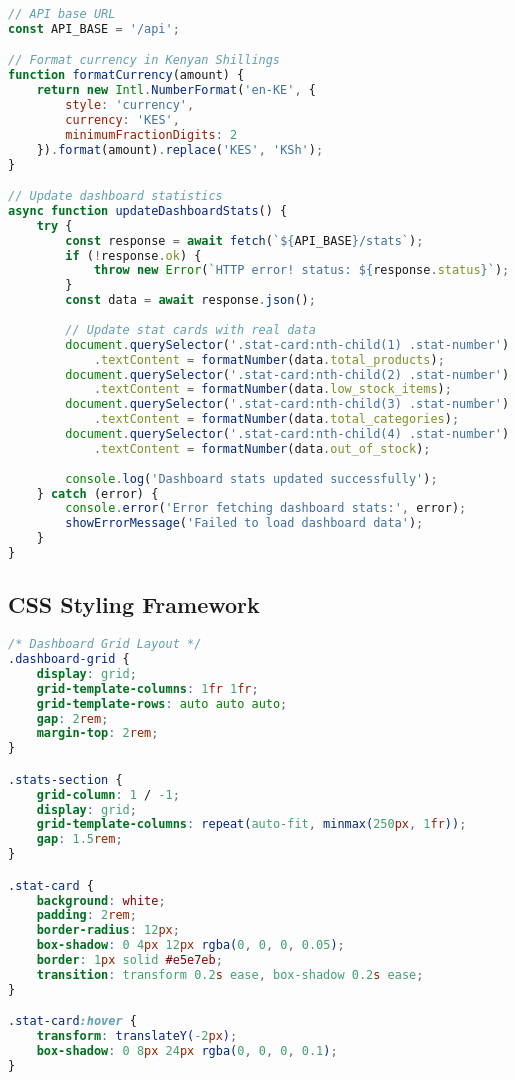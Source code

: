 \documentclass[12pt,a4paper]{article}
\begin{document}
\begin{lstlisting}[language=JavaScript, caption=Dashboard API Integration]
// API base URL
const API_BASE = '/api';

// Format currency in Kenyan Shillings
function formatCurrency(amount) {
    return new Intl.NumberFormat('en-KE', {
        style: 'currency',
        currency: 'KES',
        minimumFractionDigits: 2
    }).format(amount).replace('KES', 'KSh');
}

// Update dashboard statistics
async function updateDashboardStats() {
    try {
        const response = await fetch(`${API_BASE}/stats`);
        if (!response.ok) {
            throw new Error(`HTTP error! status: ${response.status}`);
        }
        const data = await response.json();
        
        // Update stat cards with real data
        document.querySelector('.stat-card:nth-child(1) .stat-number')
            .textContent = formatNumber(data.total_products);
        document.querySelector('.stat-card:nth-child(2) .stat-number')
            .textContent = formatNumber(data.low_stock_items);
        document.querySelector('.stat-card:nth-child(3) .stat-number')
            .textContent = formatNumber(data.total_categories);
        document.querySelector('.stat-card:nth-child(4) .stat-number')
            .textContent = formatNumber(data.out_of_stock);
        
        console.log('Dashboard stats updated successfully');
    } catch (error) {
        console.error('Error fetching dashboard stats:', error);
        showErrorMessage('Failed to load dashboard data');
    }
}
\end{lstlisting}

\subsection{CSS Styling Framework}

\begin{lstlisting}[language=CSS, caption=Modern CSS Grid Layout]
/* Dashboard Grid Layout */
.dashboard-grid {
    display: grid;
    grid-template-columns: 1fr 1fr;
    grid-template-rows: auto auto auto;
    gap: 2rem;
    margin-top: 2rem;
}

.stats-section {
    grid-column: 1 / -1;
    display: grid;
    grid-template-columns: repeat(auto-fit, minmax(250px, 1fr));
    gap: 1.5rem;
}

.stat-card {
    background: white;
    padding: 2rem;
    border-radius: 12px;
    box-shadow: 0 4px 12px rgba(0, 0, 0, 0.05);
    border: 1px solid #e5e7eb;
    transition: transform 0.2s ease, box-shadow 0.2s ease;
}

.stat-card:hover {
    transform: translateY(-2px);
    box-shadow: 0 8px 24px rgba(0, 0, 0, 0.1);
}
\end{lstlisting}
\end{document}
